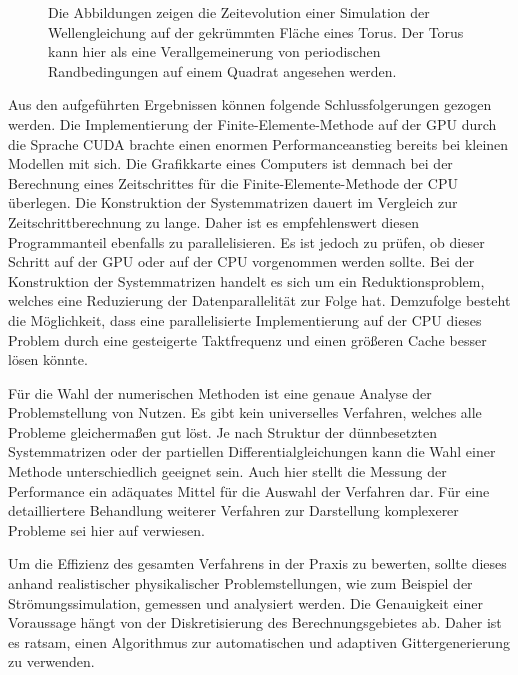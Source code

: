 \documentclass[crop=false]{standalone}
\begin{document}
\begin{figure}[b]
\begin{subfigure}[b]{0.24\textwidth}
        \caption{}
      \end{subfigure}
      \caption[Wellensimulation auf einem Torus]{%
        Die Abbildungen zeigen die Zeitevolution einer Simulation der Wellengleichung auf der gekrümmten Fläche eines Torus.
        Der Torus kann hier als eine Verallgemeinerung von periodischen Randbedingungen auf einem Quadrat angesehen werden.
      }
      \label{fig:torus-wave}
    \end{figure}

    Aus den aufgeführten Ergebnissen können folgende Schlussfolgerungen gezogen werden.
    Die Implementierung der Finite-Elemente-Methode auf der GPU durch die Sprache CUDA brachte einen enormen Performanceanstieg bereits bei kleinen Modellen mit sich.
    Die Grafikkarte eines Computers ist demnach bei der Berechnung eines Zeitschrittes für die Finite-Elemente-Methode der CPU überlegen.
    Die Konstruktion der Systemmatrizen dauert im Vergleich zur Zeitschrittberechnung zu lange.
    Daher ist es empfehlenswert diesen Programmanteil ebenfalls zu parallelisieren.
    Es ist jedoch zu prüfen, ob dieser Schritt auf der GPU oder auf der CPU vorgenommen werden sollte.
    Bei der Konstruktion der Systemmatrizen handelt es sich um ein Reduktionsproblem, welches eine Reduzierung der Datenparallelität zur Folge hat.
    Demzufolge besteht die Möglichkeit, dass eine parallelisierte Implementierung auf der CPU dieses Problem durch eine gesteigerte Taktfrequenz und einen größeren Cache besser lösen könnte.

    Für die Wahl der numerischen Methoden ist eine genaue Analyse der Problemstellung von Nutzen.
    Es gibt kein universelles Verfahren, welches alle Probleme gleichermaßen gut löst.
    Je nach Struktur der dünnbesetzten Systemmatrizen oder der partiellen Differentialgleichungen kann die Wahl einer Methode unterschiedlich geeignet sein.
    Auch hier stellt die Messung der Performance ein adäquates Mittel für die Auswahl der Verfahren dar.
    Für eine detailliertere Behandlung weiterer Verfahren zur Darstellung komplexerer Probleme sei hier auf \cite{Bell2008,Bell2009,Nocedal2006,Logan2007} verwiesen.

    Um die Effizienz des gesamten Verfahrens in der Praxis zu bewerten, sollte dieses anhand realistischer physikalischer Problemstellungen, wie zum Beispiel der Strömungssimulation, gemessen und analysiert werden.
    Die Genauigkeit einer Voraussage hängt von der Diskretisierung des Berechnungsgebietes ab.
    Daher ist es ratsam, einen Algorithmus zur automatischen und adaptiven Gittergenerierung zu verwenden.
\end{document}
